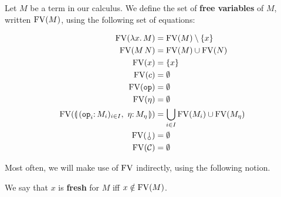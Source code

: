 \begin{definition}
  Let $M$ be a term in our calculus. We define the set of \textbf{free
    variables} of $M$, written $\operatorname{FV}(M)$, using the following set of
  equations:

  \begin{align*}
    \FV(\lam{x}{M}) &= \FV(M) \setminus \{x\} \\
    \FV(\ap{M}{N}) &= \FV(M) \cup \FV(N) \\
    \FV(x) &= \{x\} \\
    \FV(c) &= \emptyset \\
    \FV(\op{op}) &= \emptyset \\
    \FV(\eta) &= \emptyset \\
    \FV(\cibanana) &= \bigcup_{i \in I} \FV(M_i) \cup \FV(M_\eta) \\
    \FV(\cherry) &= \emptyset \\
    \FV(\CC) &= \emptyset
  \end{align*}
\end{definition}

Most often, we will make use of $\operatorname{FV}$ indirectly, using the following
notion.

\begin{definition}
  We say that $x$ is \textbf{fresh} for $M$ iff $x \notin \operatorname{FV}(M)$.
\end{definition}

